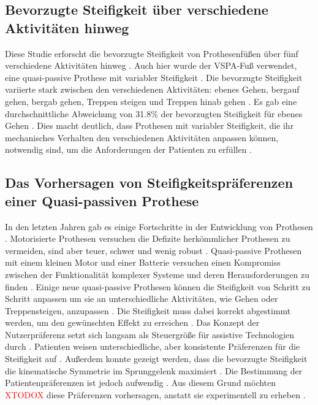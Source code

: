 \subsection{Bevorzugte Steifigkeit über verschiedene Aktivitäten hinweg}
Diese Studie erforscht die bevorzugte Steifigkeit von Prothesenfüßen über fünf verschiedene Aktivitäten hinweg \cite{InstituteofElectricalandElectronicsEngineers.2024}. Auch hier wurde der VSPA-Fuß verwendet, eine quasi-passive Prothese mit variabler Steifigkeit \cite{InstituteofElectricalandElectronicsEngineers.2024}. Die bevorzugte Steifigkeit variierte stark zwischen den verschiedenen Aktivitäten: ebenes Gehen, bergauf gehen, bergab gehen, Treppen steigen und Treppen hinab gehen \cite{InstituteofElectricalandElectronicsEngineers.2024}. Es gab eine durchschnittliche Abweichung von 31.8\% der bevorzugten Steifigkeit für ebenes Gehen \cite{InstituteofElectricalandElectronicsEngineers.2024}. Dies macht deutlich, dass Prothesen mit variabler Steifigkeit, die ihr mechanisches Verhalten den verschiedenen Aktivitäten anpassen können, notwendig sind, um die Anforderungen der Patienten zu erfüllen \cite{InstituteofElectricalandElectronicsEngineers.2024}.

\subsection{Das Vorhersagen von Steifigkeitspräferenzen einer Quasi-passiven Prothese}
In den letzten Jahren gab es einige Fortschritte in der Entwicklung von Prothesen \cite{Shetty.2022}. Motorisierte Prothesen versuchen die Defizite herkömmlicher Prothesen zu vermeiden, sind aber teuer, schwer und wenig robust \cite{Shetty.2022}. Quasi-passive Prothesen mit einem kleinen Motor und einer Batterie versuchen einen Kompromiss zwischen der Funktionalität komplexer Systeme und deren Herausforderungen zu finden \cite{Shetty.2022}. 
Einige neue quasi-passive Prothesen können die Steifigkeit von Schritt zu Schritt anpassen um sie an unterschiedliche Aktivitäten, wie Gehen oder Treppensteigen, anzupassen \cite{Shetty.2022}. Die Steifigkeit muss dabei korrekt abgestimmt werden, um den gewünschten Effekt zu erreichen \cite{Shetty.2022}. Das Konzept der Nutzerpräferenz setzt sich langsam als Steuergröße für assistive Technologien durch \cite{Shetty.2022}. Patienten weisen unterschiedliche, aber konsistente Präferenzen für die Steifigkeit auf \cite{Shetty.2022}. Außerdem konnte gezeigt werden, dass die bevorzugte Steifigkeit die kinematische Symmetrie im Sprunggelenk maximiert \cite{Shetty.2022}. Die Bestimmung der Patientenpräferenzen ist jedoch aufwendig \cite{Shetty.2022}. Aus diesem Grund möchten \textcolor{red}{XTODOX} diese Präferenzen vorhersagen, anstatt sie experimentell zu erheben \cite{Shetty.2022}. 


